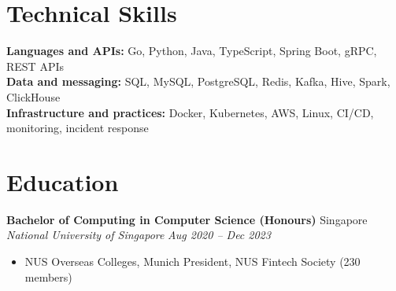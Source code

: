 \documentclass[11pt,a4paper]{article}
\newcommand{\entry}[4]{%
  \vspace{3pt}
  \noindent\textbf{#1} \hfill \textnormal{#3} \\[-2pt]
  \noindent\textit{#2} \hfill \textit{#4}
}
\begin{document}
\section{Technical Skills}

\vspace{3pt}
\noindent\textbf{Languages and APIs:} Go, Python, Java, TypeScript, Spring Boot, gRPC, REST APIs \\[2pt]
\noindent\textbf{Data and messaging:} SQL, MySQL, PostgreSQL, Redis, Kafka, Hive, Spark, ClickHouse \\[2pt]
\noindent\textbf{Infrastructure and practices:} Docker, Kubernetes, AWS, Linux, CI/CD, monitoring, incident response

\section{Education}

\entry{Bachelor of Computing in Computer Science (Honours)}{National University of Singapore}{Singapore}{Aug 2020 -- Dec 2023}
\begin{itemize}
  \item NUS Overseas Colleges, Munich \enspace\textbar\enspace President, NUS Fintech Society (230 members)
\end{itemize}
\end{document}
